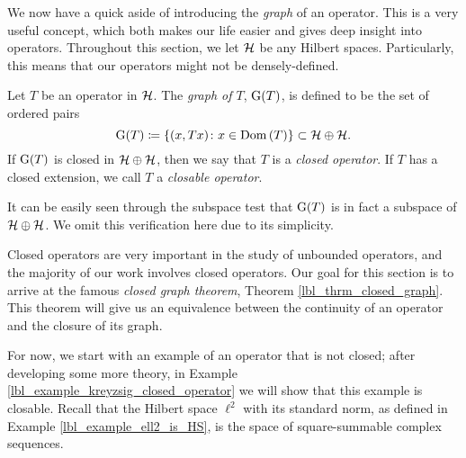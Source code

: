 We now have a quick aside of introducing the {\emph{graph}} of an operator. This is a very useful concept, which both makes our life easier and gives deep insight into operators. Throughout this section, we let $\mathcal{H}$ be any Hilbert spaces. Particularly, this means that our operators might not be densely-defined.

\begin{definition}
  Let $T$ be an operator in $\mathcal{H}$. The {\emph{graph of $T$}}, $\operatorname{G}(T)$, is defined to be the set of ordered pairs
  \begin{equation*}
    \operatorname{G}(T) \coloneqq \left\{ (x, Tx) \colon x \in \operatorname{Dom}\left(T\right)\right\} \subset \mathcal{H} \oplus \mathcal{H}.
  \end{equation*}
  If $\operatorname{G}(T)$ is closed in $\mathcal{H} \oplus \mathcal{H}$, then we say that $T$ is a {\emph{closed operator}}. If $T$ has a closed extension, we call $T$ a {\emph{closable operator}}.
\end{definition}
\begin{remark}
  It can be easily seen through the subspace test that $\operatorname{G}(T)$ is in fact a subspace of $\mathcal{H} \oplus \mathcal{H}$. We omit this verification here due to its simplicity.
\end{remark}

Closed operators are very important in the study of unbounded operators, and the majority of our work involves closed operators. Our goal for this section is to arrive at the famous {\emph{closed graph theorem}}, Theorem \eqref{lbl_thrm_closed_graph}. This theorem will give us an equivalence between the continuity of an operator and the closure of its graph.

\medskip

For now, we start with an example of an operator that is not closed; after developing some more theory, in Example \eqref{lbl_example_kreyzsig_closed_operator} we will show that this example is closable. Recall that the Hilbert space $\ell^2$ with its standard norm, as defined in Example \eqref{lbl_example_ell2_is_HS}, is the space of square-summable complex sequences.

